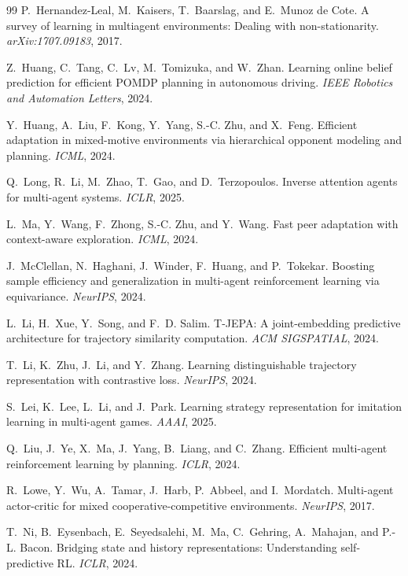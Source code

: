 \documentclass[11pt]{article}
\begin{document}
\begin{thebibliography}{99}
 P.~Hernandez-Leal, M.~Kaisers, T.~Baarslag, and
E.~Munoz de Cote. A survey of learning in multiagent environments: Dealing with
non-stationarity. \emph{arXiv:1707.09183}, 2017.

 Z.~Huang, C.~Tang, C.~Lv, M.~Tomizuka, and W.~Zhan. Learning
online belief prediction for efficient POMDP planning in autonomous driving.
\emph{IEEE Robotics and Automation Letters}, 2024.

 Y.~Huang, A.~Liu, F.~Kong, Y.~Yang, S.-C. Zhu, and
X.~Feng. Efficient adaptation in mixed-motive environments via hierarchical
opponent modeling and planning. \emph{ICML}, 2024.

 Q.~Long, R.~Li, M.~Zhao, T.~Gao, and D.~Terzopoulos.
Inverse attention agents for multi-agent systems. \emph{ICLR}, 2025.

 L.~Ma, Y.~Wang, F.~Zhong, S.-C. Zhu, and Y.~Wang. Fast peer
adaptation with context-aware exploration. \emph{ICML}, 2024.

 J.~McClellan, N.~Haghani, J.~Winder, F.~Huang, and
P.~Tokekar. Boosting sample efficiency and generalization in multi-agent
reinforcement learning via equivariance. \emph{NeurIPS}, 2024.

 L.~Li, H.~Xue, Y.~Song, and F.~D. Salim. T-JEPA: A
joint-embedding predictive architecture for trajectory similarity computation.
\emph{ACM SIGSPATIAL}, 2024.

 T.~Li, K.~Zhu, J.~Li, and Y.~Zhang. Learning distinguishable
trajectory representation with contrastive loss. \emph{NeurIPS}, 2024.

 S.~Lei, K.~Lee, L.~Li, and J.~Park. Learning strategy
representation for imitation learning in multi-agent games. \emph{AAAI}, 2025.

 Q.~Liu, J.~Ye, X.~Ma, J.~Yang, B.~Liang, and C.~Zhang. Efficient
multi-agent reinforcement learning by planning. \emph{ICLR}, 2024.

 R.~Lowe, Y.~Wu, A.~Tamar, J.~Harb, P.~Abbeel, and I.~Mordatch.
Multi-agent actor-critic for mixed cooperative-competitive environments.
\emph{NeurIPS}, 2017.

 T.~Ni, B.~Eysenbach, E.~Seyedsalehi, M.~Ma, C.~Gehring,
A.~Mahajan, and P.-L. Bacon. Bridging state and history representations:
Understanding self-predictive RL. \emph{ICLR}, 2024.


\end{thebibliography}
\end{document}
